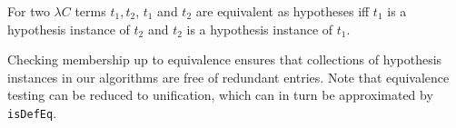 \begin{definition}
For two $\lambda C$ terms $t_1, t_2$, $t_1$ and $t_2$ are equivalent as hypotheses
iff $t_1$ is a hypothesis instance of $t_2$ and $t_2$ is a hypothesis instance of $t_1$.
\end{definition}

Checking membership up to equivalence ensures that collections of hypothesis
instances in our algorithms are free of redundant entries. Note that equivalence testing
can be reduced to unification, which can in turn be approximated by \texttt{isDefEq}.
 